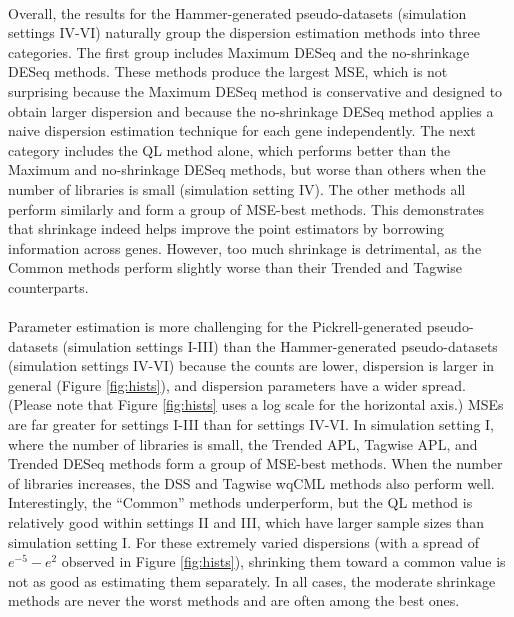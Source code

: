 \documentclass[10pt]{article}
\begin{document}
\paragraph{} \indent Overall, the results for the Hammer-generated pseudo-datasets (simulation settings IV-VI) naturally group the dispersion estimation methods into three categories. The first group includes Maximum DESeq and the no-shrinkage DESeq methods. These methods produce the largest MSE, which is not surprising because the Maximum DESeq method is conservative and designed to obtain larger dispersion and because the no-shrinkage DESeq method applies a naive dispersion estimation technique for each gene independently. The next category includes the QL method alone, which performs better than the Maximum and no-shrinkage DESeq methods, but worse than others when the number of libraries is small (simulation setting IV). The other methods all perform similarly and form a group of MSE-best methods. This demonstrates that shrinkage indeed helps improve the point estimators by borrowing information across genes. However, too much shrinkage is detrimental, as the Common methods perform %
slightly worse than their Trended and Tagwise counterparts.

\paragraph{} \indent Parameter estimation is more challenging for the Pickrell-generated pseudo-datasets (simulation settings I-III) than the Hammer-generated pseudo-datasets (simulation settings IV-VI) because the counts are lower, dispersion is larger in general (Figure \ref{fig:hists}), and dispersion parameters have a wider spread. (Please note that Figure \ref{fig:hists} uses a log scale for the horizontal axis.) MSEs are far greater for settings I-III than for settings IV-VI. In simulation setting I, where the number of libraries is small, the Trended APL, Tagwise APL, and Trended DESeq methods form a group of MSE-best methods. When the number of libraries increases, the DSS and Tagwise wqCML methods also perform well. Interestingly, the ``Common'' methods underperform, but the QL method is relatively good within settings II and III, which have larger sample sizes than simulation setting I. For these extremely varied dispersions (with a spread of $e^{-5}-e^2$ observed in Figure \ref{fig:hists}), shrinking them toward a common value is not as good as estimating them separately. In all cases, the moderate shrinkage methods are never the worst methods and are often among the best ones.
\end{document}
